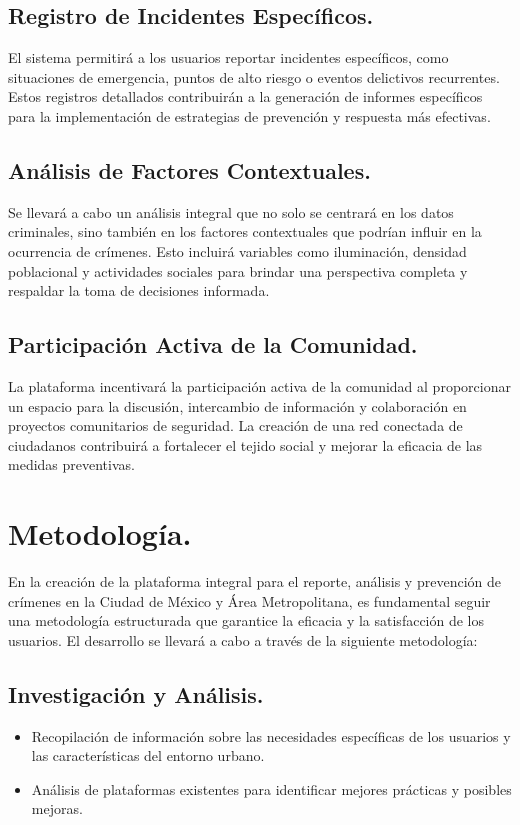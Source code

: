 \documentclass{article}
\begin{document}
    \subsection{Registro de Incidentes Específicos.}
    El sistema permitirá a los usuarios reportar incidentes específicos, como situaciones de emergencia, puntos de alto riesgo o eventos delictivos recurrentes. Estos registros detallados contribuirán a la generación de informes específicos para la implementación de estrategias de prevención y respuesta más efectivas.

    \subsection{Análisis de Factores Contextuales.}
    Se llevará a cabo un análisis integral que no solo se centrará en los datos criminales, sino también en los factores contextuales que podrían influir en la ocurrencia de crímenes. Esto incluirá variables como iluminación, densidad poblacional y actividades sociales para brindar una perspectiva completa y respaldar la toma de decisiones informada.

    \subsection{Participación Activa de la Comunidad.}
    La plataforma incentivará la participación activa de la comunidad al proporcionar un espacio para la discusión, intercambio de información y colaboración en proyectos comunitarios de seguridad. La creación de una red conectada de ciudadanos contribuirá a fortalecer el tejido social y mejorar la eficacia de las medidas preventivas.

\section{Metodología.}
En la creación de la plataforma integral para el reporte, análisis y prevención de crímenes en la Ciudad de México y Área Metropolitana, es fundamental seguir una metodología estructurada que garantice la eficacia y la satisfacción de los usuarios. El desarrollo se llevará a cabo a través de la siguiente metodología:

    \subsection{Investigación y Análisis.}
       \begin{itemize}
           \item Recopilación de información sobre las necesidades específicas de los usuarios y las características del entorno urbano.
           \item Análisis de plataformas existentes para identificar mejores prácticas y posibles mejoras.
       \end{itemize}
\end{document}
